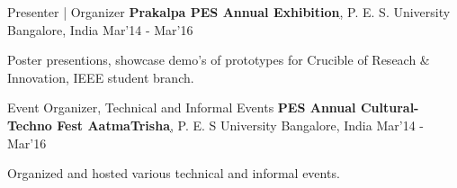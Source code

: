 \begin{cventries}

	\cventry
	{Presenter | Organizer}
	{\textbf{Prakalpa PES Annual Exhibition}\href{http://pes.edu/clubs/prakalpa/}, P. E. S. University}
	{Bangalore, India}
	{Mar'14 - Mar'16}
	{
		\begin{cvitems}
		\item{Poster presentions, showcase demo's of prototypes for Crucible of Reseach \& Innovation, IEEE student branch.}
		\end{cvitems}
	}

	\cventry
	{Event Organizer, Technical and Informal Events}
	{\textbf{PES Annual Cultural- Techno Fest AatmaTrisha}\href{http://pes.edu/clubs/atmatrisha/}, P. E. S University}
	{Bangalore, India}
	{Mar'14 - Mar'16}
	{
		\begin{cvitems}
		\item{Organized and hosted various technical and informal events.}
		\end{cvitems}
	}

\end{cventries}
